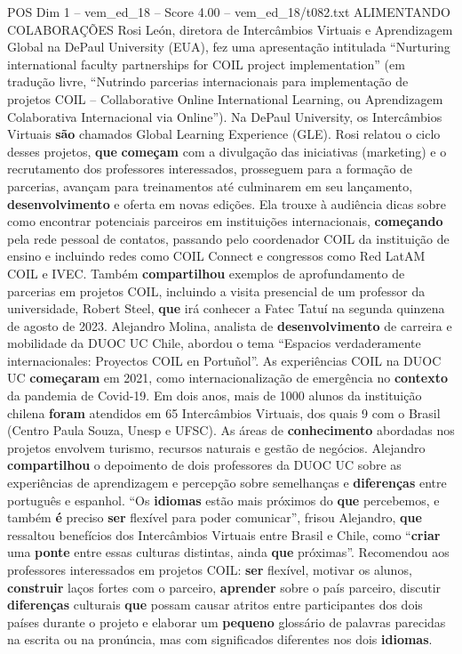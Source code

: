 \begin{textsample}{POS Dim 1 – vem\_ed\_18 – Score 4.00 – vem\_ed\_18/t082.txt}  \label{ex:f1_pos_116}
ALIMENTANDO COLABORAÇÕES Rosi León, diretora de Intercâmbios Virtuais e Aprendizagem Global na DePaul University (EUA), fez uma apresentação intitulada “Nurturing international faculty partnerships for COIL project implementation” (em tradução livre, “Nutrindo parcerias internacionais para implementação de projetos COIL – Collaborative Online International Learning, ou Aprendizagem Colaborativa Internacional via Online”).
Na DePaul University, os Intercâmbios Virtuais \textbf{são} chamados Global Learning Experience (GLE).
Rosi relatou o ciclo desses projetos, \textbf{que} \textbf{começam} com a divulgação das iniciativas (marketing) e o recrutamento dos professores interessados, prosseguem para a formação de parcerias, avançam para treinamentos até culminarem em seu lançamento, \textbf{desenvolvimento} e oferta em novas edições.
Ela trouxe à audiência dicas sobre como encontrar potenciais parceiros em instituições internacionais, \textbf{começando} pela rede pessoal de contatos, passando pelo coordenador COIL da instituição de ensino e incluindo redes como COIL Connect e congressos como Red LatAM COIL e IVEC.
Também \textbf{compartilhou} exemplos de aprofundamento de parcerias em projetos COIL, incluindo a visita presencial de um professor da universidade, Robert Steel, \textbf{que} irá conhecer a Fatec Tatuí na segunda quinzena de agosto de 2023.
Alejandro Molina, analista de \textbf{desenvolvimento} de carreira e mobilidade da DUOC UC Chile, abordou o tema “Espacios verdaderamente internacionales: Proyectos COIL en Portuñol”.
As experiências COIL na DUOC UC \textbf{começaram} em 2021, como internacionalização de emergência no \textbf{contexto} da pandemia de Covid-19.
Em dois anos, mais de 1000 alunos da instituição chilena \textbf{foram} atendidos em 65 Intercâmbios Virtuais, dos quais 9 com o Brasil (Centro Paula Souza, Unesp e UFSC).
As áreas de \textbf{conhecimento} abordadas nos projetos envolvem turismo, recursos naturais e gestão de negócios.
Alejandro \textbf{compartilhou} o depoimento de dois professores da DUOC UC sobre as experiências de aprendizagem e percepção sobre semelhanças e \textbf{diferenças} entre português e espanhol. “Os \textbf{idiomas} estão mais próximos do \textbf{que} percebemos, e também \textbf{é} preciso \textbf{ser} flexível para poder comunicar”, frisou Alejandro, \textbf{que} ressaltou benefícios dos Intercâmbios Virtuais entre Brasil e Chile, como “\textbf{criar} uma \textbf{ponte} entre essas culturas distintas, ainda \textbf{que} próximas”.
Recomendou aos professores interessados em projetos COIL: \textbf{ser} flexível, motivar os alunos, \textbf{construir} laços fortes com o parceiro, \textbf{aprender} sobre o país parceiro, discutir \textbf{diferenças} culturais \textbf{que} possam causar atritos entre participantes dos dois países durante o projeto e elaborar um \textbf{pequeno} glossário de palavras parecidas na escrita ou na pronúncia, mas com significados diferentes nos dois \textbf{idiomas}.

\end{textsample}
